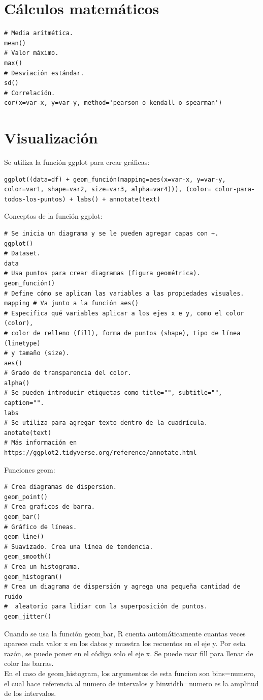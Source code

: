 \documentclass[a4paper, 12pt]{book}
\begin{document}
\section{Cálculos matemáticos}
\begin{verbatim}
# Media aritmética.
mean()
# Valor máximo.
max()
# Desviación estándar.
sd()
# Correlación.
cor(x=var-x, y=var-y, method='pearson o kendall o spearman')
\end{verbatim}
\section{Visualización}
Se utiliza la función ggplot para crear gráficas:
\begin{verbatim}
ggplot((data=df) + geom_función(mapping=aes(x=var-x, y=var-y, color=var1, shape=var2, size=var3, alpha=var4))), (color= color-para-todos-los-puntos) + labs() + annotate(text)
\end{verbatim}


Conceptos de la función ggplot:
\begin{verbatim}
# Se inicia un diagrama y se le pueden agregar capas con +.
ggplot()
# Dataset.
data
# Usa puntos para crear diagramas (figura geométrica).
geom_función()
# Define cómo se aplican las variables a las propiedades visuales.
mapping # Va junto a la función aes()
# Especifica qué variables aplicar a los ejes x e y, como el color (color),
# color de relleno (fill), forma de puntos (shape), tipo de línea (linetype)
# y tamaño (size).
aes()
# Grado de transparencia del color.
alpha()
# Se pueden introducir etiquetas como title="", subtitle="", caption="".
labs
# Se utiliza para agregar texto dentro de la cuadrícula.
anotate(text)
# Más información en https://ggplot2.tidyverse.org/reference/annotate.html
\end{verbatim}


Funciones geom:
\begin{verbatim}
# Crea diagramas de dispersion.
geom_point()
# Crea graficos de barra.
geom_bar()
# Gráfico de líneas.
geom_line()
# Suavizado. Crea una línea de tendencia.
geom_smooth()
# Crea un histograma.
geom_histogram()
# Crea un diagrama de dispersión y agrega una pequeña cantidad de ruido
#  aleatorio para lidiar con la superposición de puntos.
geom_jitter()
\end{verbatim}
Cuando se usa la función geom$\_$bar, R cuenta automáticamente cuantas veces aparece cada valor x en los datos y muestra los recuentos en el eje y. Por esta razón, se puede poner en el código solo el eje x. Se puede usar fill para llenar de color las barras. \\
En el caso de geom$\_$histogram, los argumentos de esta funcion son bins=numero, el cual hace referencia al numero de intervalos y binwidth=numero es la amplitud de los intervalos.
\end{document}
